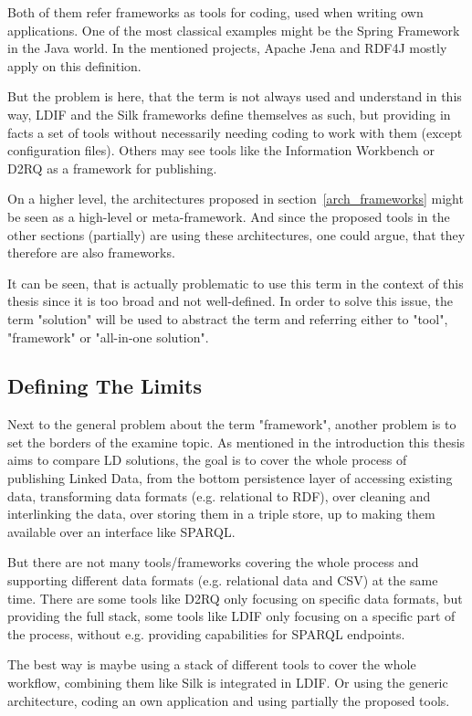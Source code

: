 Both of them refer frameworks as tools for coding, used when writing own applications. One of the most classical examples might be the Spring Framework in the Java world. In the mentioned projects, Apache Jena and RDF4J mostly apply on this definition.

But the problem is here, that the term is not always used and understand in this way, LDIF and the Silk frameworks define themselves as such, but providing in facts a set of tools without necessarily needing coding to work with them (except configuration files). Others may see tools like the Information Workbench or D2RQ as a framework for publishing.

On a higher level, the architectures proposed in section~\ref{arch_frameworks} might be seen as a high-level or meta-framework. And since the proposed tools in the other sections (partially) are using these architectures, one could argue, that they therefore are also frameworks.

It can be seen, that is actually problematic to use this term in the context of this thesis since it is too broad and not well-defined. In order to solve this issue, the term "solution" will be used to abstract the term and referring either to "tool", "framework" or "all-in-one solution".

\subsection{Defining The Limits}

Next to the general problem about the term "framework", another problem is to set the borders of the examine topic. As mentioned in the introduction this thesis aims to compare LD solutions, the goal is to cover the whole process of publishing Linked Data, from the bottom persistence layer of accessing existing data, transforming data formats (e.g. relational to RDF), over cleaning and interlinking the data, over storing them in a triple store, up to making them available over an interface like SPARQL.

But there are not many tools/frameworks covering the whole process and supporting different data formats (e.g. relational data and CSV) at the same time. There are some tools like D2RQ only focusing on specific data formats, but providing the full stack, some tools like LDIF only focusing on a specific part of the process, without e.g. providing capabilities for SPARQL endpoints.

The best way is maybe using a stack of different tools to cover the whole workflow, combining them like Silk is integrated in LDIF. Or using the generic architecture, coding an own application and using partially the proposed tools.

